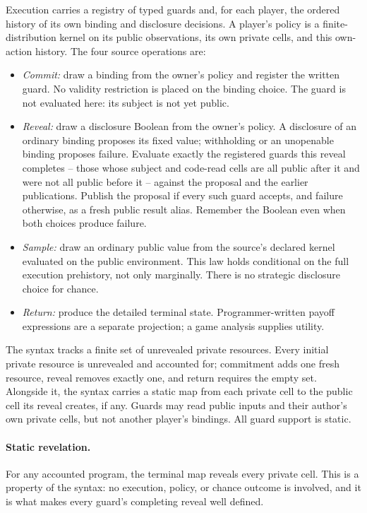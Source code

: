 \documentclass[11pt]{article}
\begin{document}
Execution carries a registry of typed guards and, for each player, the ordered
history of its own binding and disclosure decisions. A player's policy is a
finite-distribution kernel on its public observations, its own private cells,
and this own-action history. The four source operations are:
\begin{itemize}
\item \emph{Commit:} draw a binding from the owner's policy and register the
written guard. No validity restriction is placed on the binding choice. The
guard is not evaluated here: its subject is not yet public.
\item \emph{Reveal:} draw a disclosure Boolean from the owner's policy. A
disclosure of an ordinary binding proposes its fixed value; withholding or an
unopenable binding proposes failure. Evaluate exactly the registered guards
this reveal completes -- those whose subject and code-read cells are all public
after it and were not all public before it -- against the proposal and the
earlier publications. Publish the proposal if every such guard accepts, and
failure otherwise, as a fresh public result alias. Remember the Boolean even
when both choices produce failure.
\item \emph{Sample:} draw an ordinary public value from the source's declared
kernel evaluated on the public environment. This law holds conditional on the
full execution prehistory, not only marginally. There is no strategic
disclosure choice for chance.
\item \emph{Return:} produce the detailed terminal state. Programmer-written
payoff expressions are a separate projection; a game analysis supplies utility.
\end{itemize}

The syntax tracks a finite set of unrevealed private resources. Every initial
private resource is unrevealed and accounted for; commitment adds one fresh
resource, reveal removes exactly one, and return requires the empty set.
Alongside it, the syntax carries a static map from each private cell to the
public cell its reveal creates, if any. Guards may read public inputs and their
author's own private cells, but not another player's bindings. All guard
support is static.

\paragraph{Static revelation.}
For any accounted program, the terminal map reveals every private cell. This is
a property of the syntax: no execution, policy, or chance outcome is involved,
and it is what makes every guard's completing reveal well defined.
\end{document}
